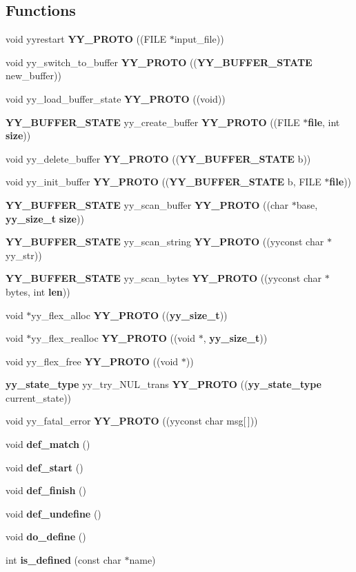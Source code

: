 \subsection*{Functions}
\begin{CompactItemize}
\item 
void yyrestart {\bf YY\_\-PROTO} ((FILE $\ast$input\_\-file))
\item 
void yy\_\-switch\_\-to\_\-buffer {\bf YY\_\-PROTO} (({\bf YY\_\-BUFFER\_\-STATE} new\_\-buffer))
\item 
void yy\_\-load\_\-buffer\_\-state {\bf YY\_\-PROTO} ((void))
\item 
{\bf YY\_\-BUFFER\_\-STATE} yy\_\-create\_\-buffer {\bf YY\_\-PROTO} ((FILE $\ast${\bf file}, int {\bf size}))
\item 
void yy\_\-delete\_\-buffer {\bf YY\_\-PROTO} (({\bf YY\_\-BUFFER\_\-STATE} b))
\item 
void yy\_\-init\_\-buffer {\bf YY\_\-PROTO} (({\bf YY\_\-BUFFER\_\-STATE} b, FILE $\ast${\bf file}))
\item 
{\bf YY\_\-BUFFER\_\-STATE} yy\_\-scan\_\-buffer {\bf YY\_\-PROTO} ((char $\ast$base, {\bf yy\_\-size\_\-t} {\bf size}))
\item 
{\bf YY\_\-BUFFER\_\-STATE} yy\_\-scan\_\-string {\bf YY\_\-PROTO} ((yyconst char $\ast$yy\_\-str))
\item 
{\bf YY\_\-BUFFER\_\-STATE} yy\_\-scan\_\-bytes {\bf YY\_\-PROTO} ((yyconst char $\ast$bytes, int {\bf len}))
\item 
void $\ast$yy\_\-flex\_\-alloc {\bf YY\_\-PROTO} (({\bf yy\_\-size\_\-t}))
\item 
void $\ast$yy\_\-flex\_\-realloc {\bf YY\_\-PROTO} ((void $\ast$, {\bf yy\_\-size\_\-t}))
\item 
void yy\_\-flex\_\-free {\bf YY\_\-PROTO} ((void $\ast$))
\item 
{\bf yy\_\-state\_\-type} yy\_\-try\_\-NUL\_\-trans {\bf YY\_\-PROTO} (({\bf yy\_\-state\_\-type} current\_\-state))
\item 
void yy\_\-fatal\_\-error {\bf YY\_\-PROTO} ((yyconst char msg[$\,$]))
\item 
void {\bf def\_\-match} ()
\item 
void {\bf def\_\-start} ()
\item 
void {\bf def\_\-finish} ()
\item 
void {\bf def\_\-undefine} ()
\item 
void {\bf do\_\-define} ()
\item 
int {\bf is\_\-defined} (const char $\ast$name)

\end{CompactItemize}
